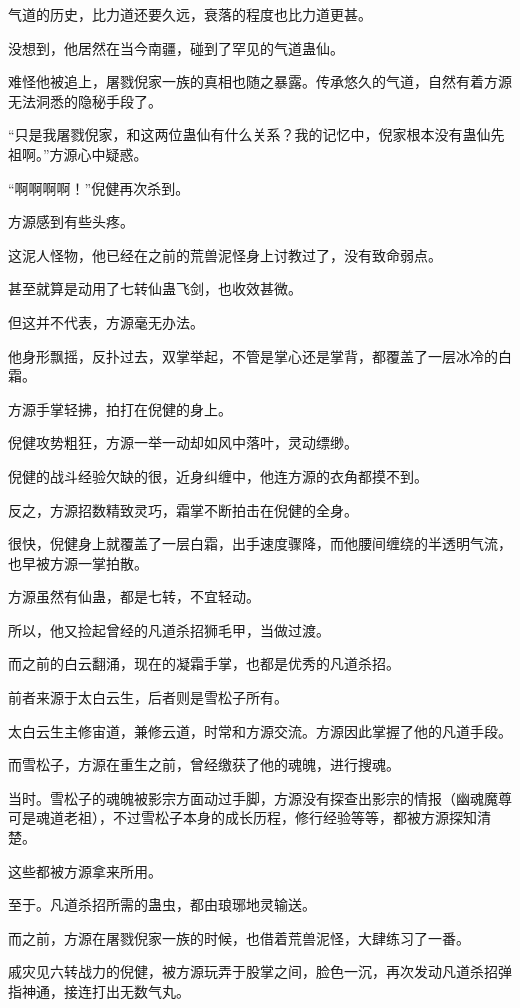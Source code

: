 \begin{this_body}
气道的历史，比力道还要久远，衰落的程度也比力道更甚。

没想到，他居然在当今南疆，碰到了罕见的气道蛊仙。

难怪他被追上，屠戮倪家一族的真相也随之暴露。传承悠久的气道，自然有着方源无法洞悉的隐秘手段了。

“只是我屠戮倪家，和这两位蛊仙有什么关系？我的记忆中，倪家根本没有蛊仙先祖啊。”方源心中疑惑。

“啊啊啊啊！”倪健再次杀到。

方源感到有些头疼。

这泥人怪物，他已经在之前的荒兽泥怪身上讨教过了，没有致命弱点。

甚至就算是动用了七转仙蛊飞剑，也收效甚微。

但这并不代表，方源毫无办法。

他身形飘摇，反扑过去，双掌举起，不管是掌心还是掌背，都覆盖了一层冰冷的白霜。

方源手掌轻拂，拍打在倪健的身上。

倪健攻势粗狂，方源一举一动却如风中落叶，灵动缥缈。

倪健的战斗经验欠缺的很，近身纠缠中，他连方源的衣角都摸不到。

反之，方源招数精致灵巧，霜掌不断拍击在倪健的全身。

很快，倪健身上就覆盖了一层白霜，出手速度骤降，而他腰间缠绕的半透明气流，也早被方源一掌拍散。

方源虽然有仙蛊，都是七转，不宜轻动。

所以，他又捡起曾经的凡道杀招狮毛甲，当做过渡。

而之前的白云翻涌，现在的凝霜手掌，也都是优秀的凡道杀招。

前者来源于太白云生，后者则是雪松子所有。

太白云生主修宙道，兼修云道，时常和方源交流。方源因此掌握了他的凡道手段。

而雪松子，方源在重生之前，曾经缴获了他的魂魄，进行搜魂。

当时。雪松子的魂魄被影宗方面动过手脚，方源没有探查出影宗的情报（幽魂魔尊可是魂道老祖），不过雪松子本身的成长历程，修行经验等等，都被方源探知清楚。

这些都被方源拿来所用。

至于。凡道杀招所需的蛊虫，都由琅琊地灵输送。

而之前，方源在屠戮倪家一族的时候，也借着荒兽泥怪，大肆练习了一番。

戚灾见六转战力的倪健，被方源玩弄于股掌之间，脸色一沉，再次发动凡道杀招弹指神通，接连打出无数气丸。


\end{this_body}
